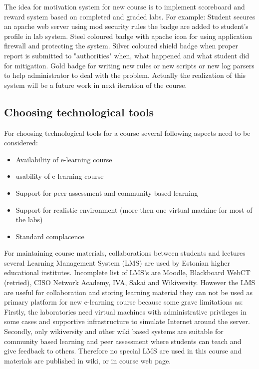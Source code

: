 The idea for motivation system for new course is to implement scoreboard and reward system based on completed and graded labs. For example: Student secures an apache web server using mod security rules the badge are added to student's profile in lab system. Steel coloured badge with apache icon for using application firewall and protecting the system. Silver coloured shield badge when proper report is submitted to "authorities" when, what happened and what student did for mitigation. Gold badge for writing new rules or new scripts or new log parsers to help administrator to deal with the problem. Actually the realization of this system will be a future work in next iteration of the course.


\subsection{Choosing technological tools}
For choosing technological tools for a course several following aspects need to be considered:

\begin{itemize}
	\item Availability of e-learning course
	\item usability of e-learning course
	\item Support for peer assessment and community based learning
	\item Support for realistic environment (more then one virtual machine for most of the labs)
	\item Standard complacence
\end{itemize}

For maintaining course materials, collaborations between students and lectures several Learning Management System (\gls{LMS}) are used by Estonian higher educational institutes. Incomplete list  of \gls{LMS}'s are Moodle, Blackboard WebCT (retried), CISO Network Academy, IVA, Sakai and Wikiversity. However the \gls{LMS} are useful for collaboration and storing learning material they can not be used as primary platform for new e-learning course because some grave limitations as: Firstly, the laboratories need virtual machines with administrative privileges in some cases  and supportive infrastructure to simulate Internet around the server. Secondly, only wikiversity and other wiki based systems are suitable for community based learning and peer assessment where students can teach and give feedback to others. Therefore no special \gls{LMS} are used in this course and materials are published in wiki, or in course web page. 






